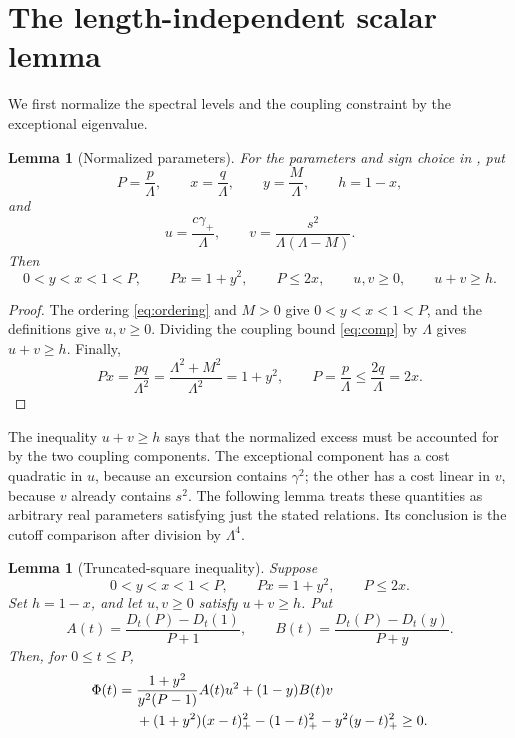 \documentclass[11pt]{article}
\numberwithin{equation}{section}
\newtheorem{lemma}[theorem]{Lemma}
\begin{document}
\section{The length-independent scalar lemma}\label{sec:scalar}
We first normalize the spectral levels and the coupling constraint
by the exceptional eigenvalue.
\begin{lemma}[Normalized parameters]\label{lem:normalization}
For the parameters and sign choice in , put
\begin{equation}\label{eq:normalizeapplication}
 P=\frac p\Lambda,\qquad x=\frac q\Lambda,\qquad
 y=\frac M\Lambda,\qquad h=1-x,
\end{equation}
and
\begin{equation}\label{eq:normalizecoupling}
 u=\frac{c\gamma_+}{\Lambda},\qquad
 v=\frac{s^2}{\Lambda(\Lambda-M)}.
\end{equation}
Then
\[
 0<y<x<1<P,\qquad Px=1+y^2,\qquad P\le2x,
 \qquad u,v\ge0,\qquad u+v\ge h.
\]
\end{lemma}
\begin{proof}
The ordering \eqref{eq:ordering} and $M>0$ give
$0<y<x<1<P$, and the definitions give $u,v\ge0$.
Dividing the coupling bound \eqref{eq:comp} by $\Lambda$ gives
$u+v\ge h$. Finally,
\[
 Px=\frac{pq}{\Lambda^2}
   =\frac{\Lambda^2+M^2}{\Lambda^2}=1+y^2,
 \qquad P=\frac p\Lambda\le\frac{2q}{\Lambda}=2x.
\]
\end{proof}
The inequality $u+v\ge h$ says that the normalized excess must be accounted for
by the two coupling components. The exceptional component has a cost
quadratic in $u$, because an excursion contains $\gamma^2$; the other
has a cost linear in $v$, because $v$ already contains $s^2$.
The following lemma treats these quantities as arbitrary real
parameters satisfying just the stated relations. Its conclusion is
the cutoff comparison after division by $\Lambda^4$.
\begin{lemma}[Truncated-square inequality]\label{lem:scalar}
Suppose
\begin{equation}\label{eq:normalized}
 0<y<x<1<P,\qquad Px=1+y^2,\qquad P\le2x.
\end{equation}
Set $h=1-x$, and let $u,v\ge0$ satisfy $u+v\ge h$. Put
\[
 A(t)=\frac{D_t(P)-D_t(1)}{P+1},\qquad
 B(t)=\frac{D_t(P)-D_t(y)}{P+y}.
\]
Then, for $0\le t\le P$,
\begin{align}\label{eq:Phi}
 \Phi(t)={}&\frac{1+y^2}{y^2(P-1)}A(t)u^2+(1-y)B(t)v\notag\\
 &+(1+y^2)(x-t)_+^2-(1-t)_+^2-y^2(y-t)_+^2
 \ge0.
\end{align}
\end{lemma}
\end{document}
